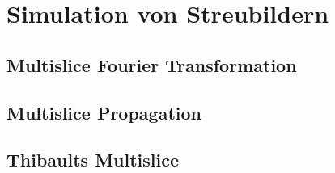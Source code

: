 \chapter{Simulation von Streubildern}
\section{Multislice Fourier Transformation}
\section{Multislice Propagation}
\section{Thibaults Multislice}
